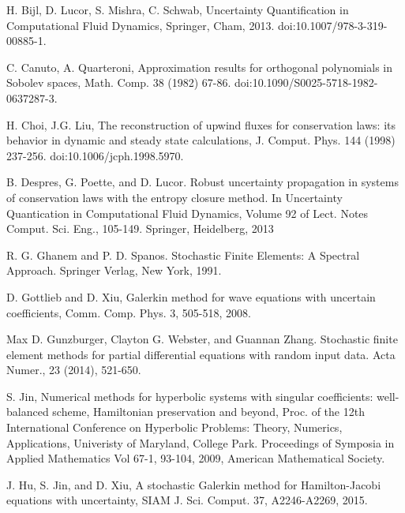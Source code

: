 \documentclass[12pt]{article}
\theoremstyle{plain}
\theoremstyle{remark}
\theoremstyle{remark}
\theoremstyle{remark}
\numberwithin{equation}{section}
\begin{document}
\begin{thebibliography}{00}




 H. Bijl, D. Lucor, S. Mishra, C. Schwab, Uncertainty Quantification in Computational Fluid Dynamics, Springer, Cham, 2013. doi:10.1007/978-3-319-00885-1.


 C. Canuto, A. Quarteroni, Approximation results for orthogonal polynomials in Sobolev spaces, Math. Comp. 38 (1982) 67-86. doi:10.1090/S0025-5718-1982-0637287-3.

 H. Choi, J.G. Liu, The reconstruction of upwind fluxes for conservation laws: its behavior in dynamic and steady state calculations, J. Comput. Phys. 144 (1998) 237-256. doi:10.1006/jcph.1998.5970.

 B. Despres, G. Poette, and D. Lucor. Robust uncertainty propagation in systems of conservation laws with the entropy closure method. In
Uncertainty Quantication in Computational Fluid Dynamics,
Volume 92 of
Lect. Notes Comput. Sci. Eng.,  105-149. Springer, Heidelberg, 2013

 R. G. Ghanem and P. D. Spanos. Stochastic Finite Elements: A Spectral Approach. Springer Verlag,
New York, 1991.

 D. Gottlieb and D. Xiu, Galerkin method for wave equations with
uncertain coefficients, Comm. Comp. Phys. 3, 505-518, 2008.

 Max D. Gunzburger, Clayton G. Webster, and Guannan Zhang. Stochastic finite element
methods for partial differential equations with random input data. Acta Numer., 23 (2014), 521-650.

 S. Jin, Numerical methods for hyperbolic systems with singular coefficients: well-balanced scheme, Hamiltonian preservation and beyond, Proc. of the 12th International Conference on Hyperbolic Problems: Theory, Numerics, Applications, Univeristy of Maryland, College Park. Proceedings of Symposia in Applied Mathematics Vol 67-1, 93-104, 2009, American Mathematical Society.

  J. Hu, S. Jin, and D. Xiu, A stochastic Galerkin method for Hamilton-Jacobi equations with uncertainty, SIAM J. Sci. Comput. 37, A2246-A2269, 2015. 


\end{thebibliography}
\end{document}
